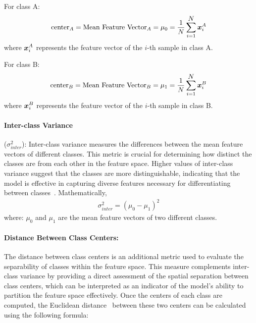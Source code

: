 For class A:
\begin{equation}
\begin{aligned}
\text{center}_A = \text{Mean Feature Vector}_A = \mu_0 = \frac{1}{\displaystyle N} \sum_{i=1}^{\displaystyle N} \displaystyle {\bm{x}}_i^A
\end{aligned}
\label{equation:4.9}
\end{equation}
where $\displaystyle {\bm{x}}_i^A$ represents the feature vector of the $i$-th sample in class A.

For class B:
\begin{equation}
\begin{aligned}
\text{center}_B = \text{Mean Feature Vector}_B = \mu_1 = \frac{1}{\displaystyle N} \sum_{i=1}^{\displaystyle N} \displaystyle {\bm{x}}_i^B
\end{aligned}
\label{equation:4.10}
\end{equation}
where $\displaystyle {\bm{x}}_i^B$ represents the feature vector of the $i$-th sample in class B.

\paragraph{Inter-class Variance} (\(\sigma_{inter}^2\)):
Inter-class variance measures the differences between the mean feature vectors of different classes. This metric is crucial for determining how distinct the classes are from each other in the feature space. Higher values of inter-class variance suggest that the classes are more distinguishable, indicating that the model is effective in capturing diverse features necessary for differentiating between classes~\citep{inter_class_yu2022generalized}.
Mathematically,
\begin{equation}
\begin{aligned}
\sigma_{inter}^2 = (\mu_0 - \mu_1)^2
\end{aligned}
\label{equation:4.11}
\end{equation}
where: \( \mu_0 \) and \( \mu_1 \) are the mean feature vectors of two different classes.

\paragraph{Distance Between Class Centers:}
The distance between class centers is an additional metric used to evaluate the separability of classes within the feature space. This measure complements inter-class variance by providing a direct assessment of the spatial separation between class centers, which can be interpreted as an indicator of the model’s ability to partition the feature space effectively. Once the centers of each class are computed, the Euclidean distance~\citep{wikipedia_euclidean_distance} between these two centers can be calculated using the following formula:

